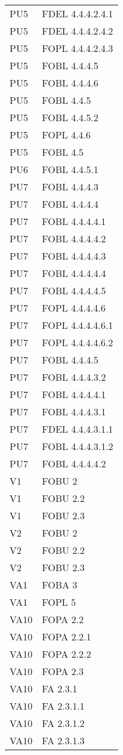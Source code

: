 \begin{longtable}{XX}
PU5&FDEL 4.4.4.2.4.1\\ 
PU5&FDEL 4.4.4.2.4.2\\ 
PU5&FOPL 4.4.4.2.4.3\\ 
PU5&FOBL 4.4.4.5\\ 
PU5&FOBL 4.4.4.6\\ 
PU5&FOBL 4.4.5\\ 
PU5&FOBL 4.4.5.2\\ 
PU5&FOPL 4.4.6\\ 
PU5&FOBL 4.5\\ 
\midrule 
PU6&FOBL 4.4.5.1\\ 
\midrule 
PU7&FOBL 4.4.4.3\\ 
PU7&FOBL 4.4.4.4\\ 
PU7&FOBL 4.4.4.4.1\\ 
PU7&FOBL 4.4.4.4.2\\ 
PU7&FOBL 4.4.4.4.3\\ 
PU7&FOBL 4.4.4.4.4\\ 
PU7&FOBL 4.4.4.4.5\\ 
PU7&FOPL 4.4.4.4.6\\ 
PU7&FOPL 4.4.4.4.6.1\\ 
PU7&FOPL 4.4.4.4.6.2\\ 
PU7&FOBL 4.4.4.5\\ 
\midrule 
PU7&FOBL 4.4.4.3.2\\ 
PU7&FOBL 4.4.4.4.1\\ 
\midrule 
PU7&FOBL 4.4.4.3.1\\ 
PU7&FDEL 4.4.4.3.1.1\\ 
PU7&FOBL 4.4.4.3.1.2\\ 
PU7&FOBL 4.4.4.4.2\\ 
\midrule 
V1&FOBU 2\\ 
V1&FOBU 2.2\\ 
V1&FOBU 2.3\\ 
\midrule 
V2&FOBU 2\\ 
V2&FOBU 2.2\\ 
V2&FOBU 2.3\\ 
\midrule 
VA1&FOBA 3\\ 
VA1&FOPL 5\\ 
\midrule 
VA10&FOPA 2.2\\ 
VA10&FOPA 2.2.1\\ 
VA10&FOPA 2.2.2\\ 
VA10&FOPA 2.3\\ 
VA10&FA 2.3.1\\ 
VA10&FA 2.3.1.1\\ 
VA10&FA 2.3.1.2\\ 
VA10&FA 2.3.1.3\\ 

\end{longtable}
